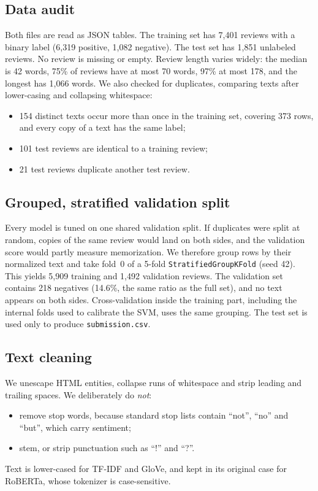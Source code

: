 \subsection{Data audit}
Both files are read as JSON tables.
The training set has 7{,}401 reviews with a binary label (6{,}319 positive, 1{,}082 negative). The test set has 1{,}851 unlabeled reviews. No review is missing or empty.
Review length varies widely: the median is 42 words, 75\% of reviews have at most 70 words, 97\% at most 178, and the longest has 1{,}066 words.
We also checked for duplicates, comparing texts after lower-casing and collapsing whitespace:
\begin{itemize}
  \item 154 distinct texts occur more than once in the training set, covering 373 rows, and every copy of a text has the same label;
  \item 101 test reviews are identical to a training review;
  \item 21 test reviews duplicate another test review.
\end{itemize}

\subsection{Grouped, stratified validation split}
Every model is tuned on one shared validation split.
If duplicates were split at random, copies of the same review would land on both sides, and the validation score would partly measure memorization.
We therefore group rows by their normalized text and take fold~0 of a 5-fold \texttt{StratifiedGroupKFold} (seed 42).
This yields 5{,}909 training and 1{,}492 validation reviews. The validation set contains 218 negatives (14.6\%, the same ratio as the full set), and no text appears on both sides.
Cross-validation inside the training part, including the internal folds used to calibrate the SVM, uses the same grouping.
The test set is used only to produce \texttt{submission.csv}.

\subsection{Text cleaning}
We unescape HTML entities, collapse runs of whitespace and strip leading and trailing spaces.
We deliberately do \emph{not}:
\begin{itemize}
  \item remove stop words, because standard stop lists contain ``not'', ``no'' and ``but'', which carry sentiment;
  \item stem, or strip punctuation such as ``!'' and ``?''.
\end{itemize}
Text is lower-cased for TF-IDF and GloVe, and kept in its original case for RoBERTa, whose tokenizer is case-sensitive.

